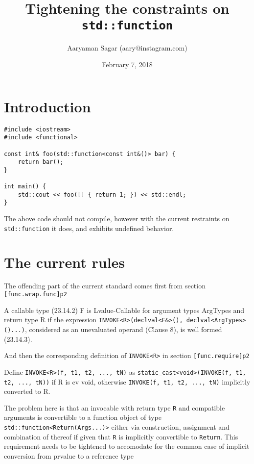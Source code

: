 \documentclass{article}
\begin{document}
\title{\textbf{Tightening the constraints on \texttt{std::function}}}
\author{Aaryaman Sagar (aary@instagram.com)}
\date{February 7, 2018}
\maketitle

\section{Introduction}

\begin{lstlisting}
#include <iostream>
#include <functional>

const int& foo(std::function<const int&()> bar) {
    return bar();
}

int main() {
    std::cout << foo([] { return 1; }) << std::endl;
}
\end{lstlisting}

The above code should not compile, however with the current restraints on
\texttt{std::function} it does, and exhibits undefined behavior.

\section{The current rules}
The offending part of the current standard comes first from section
\texttt{[func.wrap.func]p2}
\begin{displayquote}
A callable type (23.14.2) F is Lvalue-Callable for argument types ArgTypes and
return type R if the expression \texttt{INVOKE<R>(declval<F&>(),
declval<ArgTypes>()...)}, considered as an unevaluated operand (Clause 8), is
well formed (23.14.3).
\end{displayquote}

And then the corresponding definition of \texttt{INVOKE<R>} in section
\texttt{[func.require]p2}
\begin{displayquote}
Define \texttt{INVOKE<R>(f, t1, t2, ..., tN)} as
\texttt{static\_cast<void>(INVOKE(f, t1, t2, ..., tN))} if R is cv void,
otherwise \texttt{INVOKE(f, t1, t2, ..., tN)} implicitly converted to R.
\end{displayquote}

The problem here is that an invocable with return type \texttt{R} and
compatible arguments is convertible to a function object of type
\texttt{std::function<Return(Args...)>} either via construction, assignment
and combination of thereof if given that \texttt{R} is implicitly convertible to
\texttt{Return}.  This requirement needs to be tightened to accomodate for the
common case of implicit conversion from prvalue to a reference type
\end{document}
